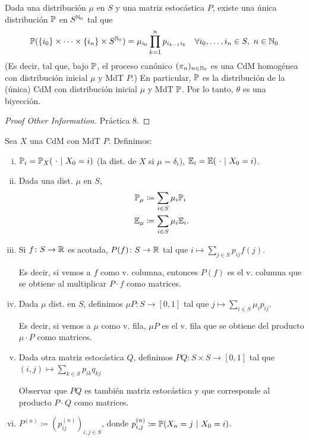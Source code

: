 \begin{theorem}
	Dada una distribución $\mu$ en $S$ y una matriz estocástica $P$, existe una única distribución $\mathbb{P}$ en $S^{\mathbb{N}_{0}}$ tal que
	\[ \mathbb{P}(\{i_{0}\} \times \cdots \times \{i_{n}\} \times S^{\mathbb{N}_{0}}) = \mu_{i_{0}} \prod_{k=1}^{n} p_{i_{k-1} i_{k}} \quad \forall i_{0},\dots,i_{n} \in S,\ n \in \mathbb{N}_{0} \]
	(Es decir, tal que, bajo $\mathbb{P}$, el proceso canónico $(\pi_{n})_{n \in \mathbb{N}_{0}}$ es una CdM homogénea con distribución inicial $\mu$ y MdT $P$.) En particular, $\mathbb{P}$ es la distribución de la (única) CdM con distribución inicial $\mu$ y MdT $\mathbb{P}$. Por lo tanto, $\theta$ es una biyección.
\end{theorem}
\begin{proof}[Proof Other Information]
	Práctica 8.
\end{proof}

\begin{notation}
	Sea $X$ una CdM con MdT $P$. Definimos:
	\begin{enumerate}[i)]
		\item $\mathbb{P}_{i} = \mathbb{P}_{X}(\ \cdot \ | \ X_{0} = i)$ (la dist. de $X$ si $\mu = \delta_{i}$), $\mathbb{E}_{i} = \mathbb{E}(\ \cdot \ | \ X_{0} = i)$.

		\item Dada una dist. $\mu$ en $S$,
		\begin{align*}
			\mathbb{P}_{\mu} &\coloneq \sum_{i \in S} \mu_{i} \mathbb{P}_{i} \\
			\mathbb{E}_{\mu} &\coloneq \sum_{i \in S} \mu_{i} \mathbb{E}_{i}
		.\end{align*}

		\item Si $f \colon S \to \mathbb{R}$ es acotada, $P(f) \colon S \to \mathbb{R}$ tal que $i \mapsto \sum_{j \in S} p_{ij} f(j)$. \par
		Es decir, si vemos a $f$ como v. columna, entonces $P(f)$ es el v. columna que se obtiene al multiplicar $P \cdot f$ como matrices.

		\item Dada $\mu$ dist. en $S$, definimos $\mu P \colon S \to [0,1]$ tal que $j \mapsto \sum_{i \in S} \mu_{i} p_{ij}$. \par
		Es decir, si vemos a $\mu$ como v. fila, $\mu P$ es el v. fila que se obtiene del producto $\mu \cdot P$ como matrices.

		\item Dada otra matriz estocástica $Q$, definimos $PQ \colon S \times S \to [0,1]$ tal que $(i,j) \mapsto \sum_{k \in S} p_{ik} q_{kj}$ \par
		Observar que $PQ$ es también matriz estocástica y que corresponde al producto $P \cdot Q$ como matrices.

		\item $P^{(n)} \coloneq (p_{ij}^{(n)})_{i,j \in S}$, donde $p_{i,j}^{(n)} \coloneq \mathbb{P}(X_{n} = j \ | \ X_{0} = i)$.
	\end{enumerate}
\end{notation}

